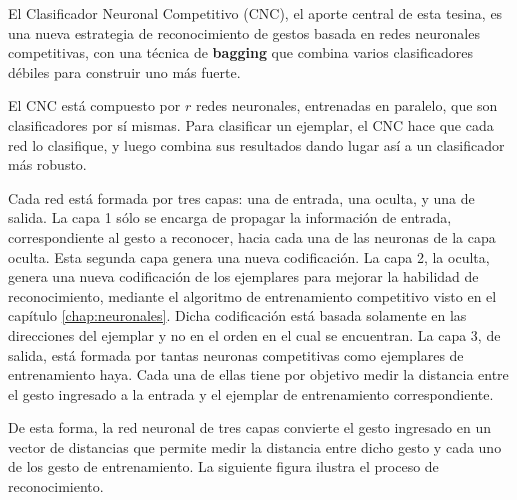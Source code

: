

El Clasificador Neuronal Competitivo (CNC), el aporte central de esta tesina, es una nueva estrategia de reconocimiento de gestos basada en redes neuronales competitivas, con una técnica de \textbf{bagging} que combina varios clasificadores débiles para construir uno más fuerte. 

El CNC está compuesto por $r$ redes neuronales, entrenadas en paralelo, que son clasificadores por sí mismas. Para clasificar un ejemplar, el CNC hace que cada red lo clasifique, y luego combina sus resultados dando lugar así a un clasificador más robusto. 


Cada red está formada por tres capas: una de entrada, una oculta, y una de salida. La capa 1 sólo se encarga de propagar la información de entrada, correspondiente al gesto a reconocer, hacia cada una de las neuronas de la capa oculta. Esta segunda capa genera una nueva codificación. La capa 2, la oculta, genera una nueva codificación de los ejemplares para mejorar la habilidad de reconocimiento, mediante el algoritmo de entrenamiento competitivo visto en el capítulo \ref{chap:neuronales}. Dicha codificación está basada solamente en las direcciones del ejemplar y no en el orden en el cual se encuentran. La capa 3, de salida, está formada por tantas neuronas competitivas como ejemplares de entrenamiento haya. Cada una de ellas tiene por objetivo medir la distancia entre el gesto ingresado a la entrada y el ejemplar de entrenamiento correspondiente. 

De esta forma, la red neuronal de tres capas convierte el gesto ingresado en un vector de distancias que permite medir la distancia entre dicho gesto y cada uno de los gesto de entrenamiento.  La siguiente figura ilustra el proceso de reconocimiento.





